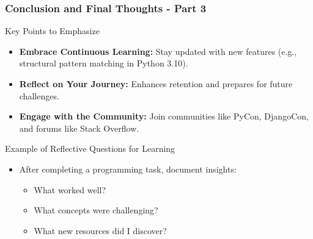 \documentclass{beamer}
\begin{document}
\begin{frame}[fragile]
    \frametitle{Conclusion and Final Thoughts - Part 3}
    
    \begin{block}{Key Points to Emphasize}
        \begin{itemize}
            \item \textbf{Embrace Continuous Learning:} Stay updated with new features (e.g., structural pattern matching in Python 3.10).
            \item \textbf{Reflect on Your Journey:} Enhances retention and prepares for future challenges.
            \item \textbf{Engage with the Community:} Join communities like PyCon, DjangoCon, and forums like Stack Overflow.
        \end{itemize}
    \end{block}
    
    \begin{block}{Example of Reflective Questions for Learning}
        \begin{itemize}
            \item After completing a programming task, document insights:
            \begin{itemize}
                \item What worked well?
                \item What concepts were challenging?
                \item What new resources did I discover?
            \end{itemize}
        \end{itemize}
    \end{block}
\end{frame}
\end{document}
